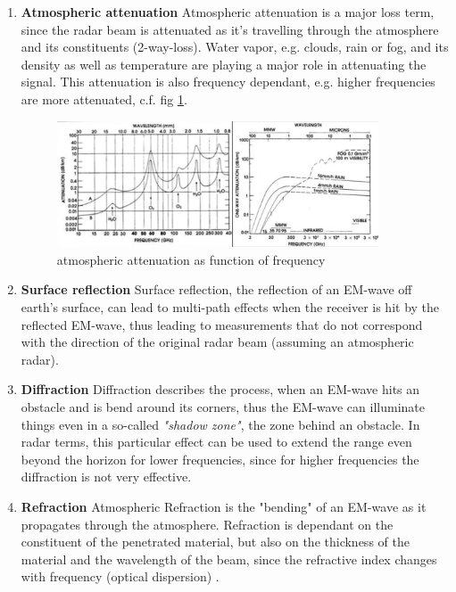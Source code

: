 \begin{enumerate}
	\item \textbf{Atmospheric attenuation} \newline
			Atmospheric attenuation is a major loss term, since the radar beam is attenuated as it's travelling through the atmosphere and its constituents (2-way-loss).
			Water vapor, e.g. clouds, rain or fog, and its density as well as temperature are playing a major role in attenuating the signal. This attenuation is also frequency dependant, e.g. higher frequencies are more attenuated, c.f. fig \ref{fig:attenuation}.
			\begin{figure}[!htbp]
			\centering
			\includegraphics[width=0.9\textwidth]{images/attenuation}
			\caption{atmospheric attenuation as function of frequency \citep{erickson:lecture}}
			\label{fig:attenuation}
			\end{figure}
	\item \textbf{Surface reflection} \newline
			Surface reflection, the reflection of an EM-wave off earth's surface, can lead to multi-path effects when the receiver is hit by the reflected EM-wave, thus leading to measurements that do not correspond with the direction of the original radar beam (assuming an atmospheric radar).
	\item \textbf{Diffraction} \newline
			Diffraction describes the process, when an EM-wave hits an obstacle and is bend around its corners, thus the EM-wave can illuminate things even in a so-called \textit{"shadow zone"}, the zone behind an obstacle. In radar terms, this particular effect can be used to extend the range even beyond the horizon for lower frequencies, since for higher frequencies the diffraction is not very effective.
	\item \textbf{Refraction} \newline
			Atmospheric Refraction is the "bending" of an EM-wave as it propagates through the atmosphere. Refraction is dependant on the constituent of the penetrated material, but also on the thickness of the material and the wavelength of the beam, since the refractive index changes with frequency (optical dispersion) \citep{erickson:lecture}.
	
\end{enumerate}



